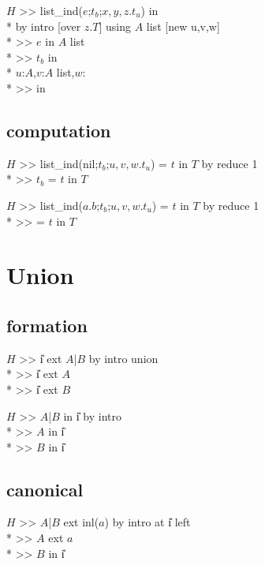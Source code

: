 \goalskip

\goal $H$ >> list\_ind($e$;$t_b$;$x,y,z.t_u$) in  \\*
\continuegoal by intro [over $z.T$] using $A$ list [new u,v,w] \\*
\subgoal >> $e$ in $A$ list \\*
\subgoal >> $t_b$ in  \\*
\subgoal$u$:$A$,$v$:$A$ list,$w$: \\*
\continuesubgoal >>  in 

\subsection*{computation}
\goalgroup $H$ >> list\_ind(nil;$t_b$;$u,v,w.t_u$) = $t$ in $T$  by reduce 1 \\*
\subgoal >> $t_b$ = $t$ in $T$

\goalskip

\goal $H$ >> list\_ind($a.b$;$t_b$;$u,v,w.t_u$) = $t$ in $T$ by reduce 1 \\*
\subgoal >> 
                = $t$ in $T$
\par


  
\section{Union}
\subsection*{formation}
\goal $H$ >> \U{i} ext $A$|$B$ by intro union \\*
\subgoal >> \U{i} ext $A$ \\*
\subgoal >> \U{i} ext $B$


\goalskip

\goal $H$ >> $A$|$B$ in \U{i} by intro\\*
\subgoal >> $A$ in \U{i} \\*
\subgoal >> $B$ in \U{i}

\subsection*{canonical}
\goal $H$ >> $A$|$B$ ext inl($a$) by intro at \U{i} left \\*
\subgoal >> $A$ ext $a$\\*
\subgoal >> $B$ in \U{i}


